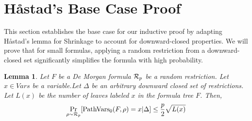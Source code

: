 \documentclass[11pt]{article}
\newtheorem{lemma}[theorem]{Lemma}
\begin{document}
\section{Håstad's Base Case Proof}

This section establishes the base case for our inductive proof by adapting Håstad's lemma for Shrinkage to account for downward-closed properties. 
We will prove that for small formulas, applying a random restriction from a downward-closed set significantly simplifies the formula with high probability. 

\begin{lemma}
\label{lem: Base_case}
    Let $F$ be a De Morgan formula $\mathcal{R}_p$ be a random restriction. Let $x \in Vars$ be a variable.Let $\Delta$ be an arbitrary downward closed set of restrictions. Let $L(x)$ be the number of leaves labeled $x$ in the formula tree $F$. Then, 
    $$\Pr_{\rho \sim \mathcal{R}_p}[\operatorname{PathVars}_0(F,\rho) =x|\Delta] \le \frac{p}2\sqrt{L(x)}$$
\end{lemma}
\end{document}
